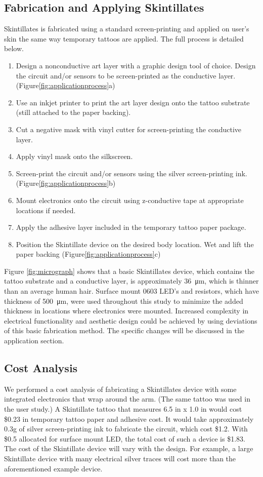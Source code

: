 \documentclass{sigchi}
\begin{document}
\subsection{Fabrication and Applying Skintillates}
Skintillates is fabricated using a standard screen-printing and applied on user’s skin the same way temporary tattoos are applied. The full process is detailed below. 
\begin{enumerate}
  \item Design a nonconductive art layer with a graphic design tool of choice. Design the circuit and/or sensors to be screen-printed as the conductive layer. (Figure\ref{fig:applicationprocess}a)
  \item Use an inkjet printer to print the art layer design onto the tattoo substrate (still attached to the paper backing). 
  \item Cut a negative mask with vinyl cutter for screen-printing the conductive layer. 
  \item Apply vinyl mask onto the silkscreen. 
  \item Screen-print the circuit and/or sensors using the silver screen-printing ink.(Figure\ref{fig:applicationprocess}b)
  \item Mount electronics onto the circuit using z-conductive tape at appropriate locations if needed.   
  \item Apply the adhesive layer included in the temporary tattoo paper package. 
  \item Position the Skintillate device on the desired body location. Wet and lift the paper backing (Figure\ref{fig:applicationprocess}c)
\end{enumerate}
Figure \ref{fig:micrograph} shows that a basic Skintillates device, which contains the tattoo substrate and a conductive layer, is approximately 36\SI{}{\micro\metre}, which is thinner than an average human hair. Surface mount 0603 LED's and resistors, which have thickness of  \SI{500}{\micro\metre}, were used throughout this study to minimize the added thickness in locations where electronics were mounted. Increased complexity in electrical functionality and aesthetic design could be achieved by using deviations of this basic fabrication method. The specific changes will be discussed in the application section. 

\subsection{Cost Analysis}
We performed a cost analysis of fabricating a Skintillates device with some integrated electronics that wrap around the arm. (The same tattoo was used in the user study.) A Skintillate tattoo that measures 6.5 in x 1.0 in would cost \$0.23 in temporary tattoo paper and adhesive cost. It would take approximately 0.3g of silver screen-printing ink to fabricate the circuit, which cost \$1.2. With \$0.5 allocated for surface mount LED, the total cost of such a device is \$1.83. The cost of the Skintillate device will vary with the design. For example, a large Skintillate device with many electrical silver traces will cost more than the aforementioned example device. 
\end{document}
